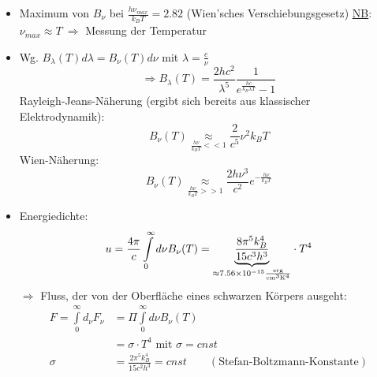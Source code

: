 \begin{itemize}[label={$\to$}]
\item Maximum von $B_\nu$ bei $\frac{h\nu_{max}}{k_BT}=2.82$ (Wien'sches Verschiebungsgesetz)
\underline{NB}: $\nu_{max}\approx T \ \Rightarrow$ Messung der Temperatur
\item Wg. $B_\lambda(T)d\lambda =B_\nu(T)d\nu$ mit $\lambda=\frac{c}{\nu}$
\begin{equation*}
\Rightarrow B_\lambda (T)=\frac{2hc^2}{\lambda^5}\frac{1}{e^{\frac{hc}{k_B\lambda T}}-1}
\end{equation*}
Rayleigh-Jeans-Näherung (ergibt sich bereits aus klassischer Elektrodynamik):
\begin{equation*}
B_\nu (T)\underset{\frac{h\nu}{k_BT}<<1}{\approx} \frac{2}{c^5}\nu^2k_BT
\end{equation*}
Wien-Näherung: 
\begin{equation*}
B_\nu(T)\underset{\frac{h\nu}{k_BT}>>1}{\approx} \frac{2h\nu^3}{c^2}e^{-\frac{h\nu}{k_BT}}
\end{equation*}
\item Energiedichte:
\begin{equation*}
u=\frac{4\pi}{c}\int\limits_0^\infty d\nu B_\nu(T)=\underset{\approx \num{7.56e-15}\si{\frac{\text{erg}}{\cm^3\K^4}}}{\underbrace{\frac{8\pi^5k_B^4}{15c^3h^3}}}\cdot T^4
\end{equation*}
$\Rightarrow $ Fluss, der von der Oberfläche eines schwarzen Körpers ausgeht:
\begin{align*}
F=\int\limits_0^\infty d_\nu F_\nu&=\Pi\int\limits_0^\infty d\nu B_\nu(T)\\
&=\sigma\cdot T^4 \text{ mit } \sigma=cnst\\
\sigma &= \frac{2\pi^5k_B^4}{15c^2h^3}=cnst \qquad (\text{Stefan-Boltzmann-Konstante})
\end{align*}
\end{itemize}
